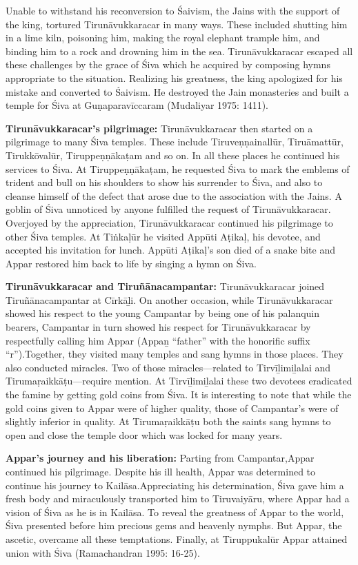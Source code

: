 Unable to withstand his reconversion to Śaivism, the Jains with the support of the king, tortured Tirunāvukkaracar in many ways. These included shutting him in a lime kiln, poisoning him, making the royal elephant trample him, and binding him to a rock and drowning him in the sea. Tirunāvukkaracar escaped all these challenges by the grace of Śiva which he acquired by composing hymns appropriate to the situation. Realizing his greatness, the king apologized for his mistake and converted to Śaivism. He destroyed the Jain monasteries and built a temple for Śiva at Guṇaparavīccaram (Mudaliyar 1975: 1411).

\textbf{Tirunāvukkaracar’s pilgrimage:} Tirunāvukkaracar then started on a pilgrimage to many Śiva temples. These include Tiruveṇṇainallūr, Tiruāmattūr, Tirukkōvalūr, Tiruppeṇṇākaṭam and so on. In all these places he continued his services to Śiva. At Tiruppeṇṇākaṭam, he requested Śiva to mark the emblems of trident and bull on his shoulders to show his surrender to Śiva, and also to cleanse himself of the defect that arose due to the association with the Jains. A goblin of Śiva unnoticed by anyone fulfilled the request of Tirunāvukkaracar. Overjoyed by the appreciation, Tirunāvukkaracar continued his pilgrimage to other Śiva temples. At Tiṅkaḷūr he visited Appūti Aṭikaḷ, his devotee, and accepted his invitation for lunch. Appūti Aṭikaḷ’s son died of a snake bite and Appar restored him back to life by singing a hymn on Śiva.

\textbf{Tirunāvukkaracar and Tiruñānacampantar:} Tirunāvukkaracar joined Tiruñānacampantar at Cīrkāḻi. On another occasion, while Tirunāvukkaracar showed his respect to the young Campantar by being one of his palanquin bearers, Campantar in turn showed his respect for Tirunāvukkaracar by respectfully calling him Appar (Appaṉ “father” with the honorific suffix “r”).Together, they visited many temples and sang hymns in those places. They also conducted miracles. Two of those miracles—related to Tirvīḻimiḻalai and Tirumaṛaikkāṭu—require mention. At Tirvīḻimiḻalai these two devotees eradicated the famine by getting gold coins from Śiva. It is interesting to note that while the gold coins given to Appar were of higher quality, those of Campantar’s were of slightly inferior in quality. At Tirumaṛaikkāṭu both the saints sang hymns to open and close the temple door which was locked for many years.

\textbf{Appar’s journey and his liberation:} Parting from Campantar,Appar continued his pilgrimage. Despite his ill health, Appar was determined to continue his journey to Kailāsa.Appreciating his determination, Śiva gave him a fresh body and miraculously transported him to Tiruvaiyāru, where Appar had a vision of Śiva as he is in Kailāsa. To reveal the greatness of Appar to the world, Śiva presented before him precious gems and heavenly nymphs. But Appar, the ascetic, overcame all these temptations. Finally, at Tiruppukalūr Appar attained union with Śiva (Ramachandran 1995: 16-25).

